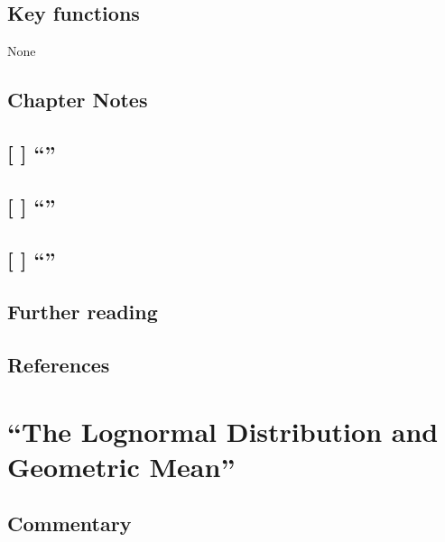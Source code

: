 \documentclass[]{book}
\theoremstyle{definition}
\theoremstyle{definition}
\theoremstyle{definition}
\theoremstyle{remark}
\begin{document}
\section*{Key functions}\label{key-functions-8}

None

\section*{Chapter Notes}\label{chapter-notes-9}

\section{\texorpdfstring{{[} {]} ``''}{{[} {]} }}\label{section-9}

\section{\texorpdfstring{{[} {]} ``''}{{[} {]} }}\label{section-10}

\section{\texorpdfstring{{[} {]} ``''}{{[} {]} }}\label{section-11}

\section*{Further reading}\label{further-reading-8}

\section*{References}\label{references-8}

\chapter{\texorpdfstring{``The Lognormal Distribution and Geometric
Mean''}{The Lognormal Distribution and Geometric Mean}}\label{ch11}

\section*{Commentary}\label{commentary-9}
\end{document}
